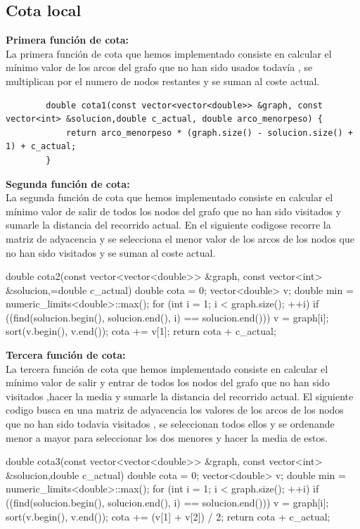 \documentclass[11pt,openany]{book}
\begin{document}
\subsection{Cota local}
\textbf{Primera función de cota:} \\
    La primera función de cota que hemos implementado consiste en calcular el mínimo valor de los arcos del grafo que no han sido 
    usados todavía , se multiplican por el numero de nodos restantes y se suman al coste actual.
    \begin{lstlisting}
        double cota1(const vector<vector<double>> &graph, const vector<int> &solucion,double c_actual, double arco_menorpeso) {
            return arco_menorpeso * (graph.size() - solucion.size() + 1) + c_actual;
        }

    \end{lstlisting}
\textbf{Segunda función de cota:} \\
    La segunda función de cota que hemos implementado consiste en calcular el mínimo valor de salir de todos los nodos del grafo que no 
    han sido visitados y sumarle la distancia del recorrido actual.
    En el siguiente codigose recorre la matriz de adyacencia y se selecciona el menor valor de los arcos de los nodos que no han sido visitados 
    y se suman al coste actual.
    \begin{listing}
        double cota2(const vector<vector<double>> &graph, const vector<int> &solucion,=double c_actual) {
            double cota = 0;
            vector<double> v;
            double min = numeric_limits<double>::max();
            for (int i = 1; i < graph.size(); ++i) {
                if ((find(solucion.begin(), solucion.end(), i) == solucion.end())) {
                    v = graph[i];
                    sort(v.begin(), v.end());
                    cota += v[1];
                }
            }
            return cota + c_actual;
        }
    \end{listing}
    \textbf{Tercera función de cota:} \\
    La tercera función de cota que hemos implementado consiste en calcular el mínimo valor de salir y entrar  de todos los nodos del grafo que no 
    han sido visitados ,hacer la media  y sumarle la distancia del recorrido actual.
    El siguiente codigo busca en una matriz de adyacencia los valores de los arcos de los nodos que no han sido todavia visitados , se 
    seleccionan todos ellos y se ordenande menor a mayor para seleccionar los dos menores y hacer la media de estos.
    \begin{listing}
        double cota3(const vector<vector<double>> &graph, const vector<int> &solucion,double c_actual) {
            double cota = 0;
            vector<double> v;
            double min = numeric_limits<double>::max();
            for (int i = 1; i < graph.size(); ++i) {
                if ((find(solucion.begin(), solucion.end(), i) == solucion.end())) {
                    v = graph[i];
                    sort(v.begin(), v.end());
                    cota += (v[1] + v[2]) / 2;
                }
            }
            return cota + c_actual;
        }
    \end{listing}
\end{document}
